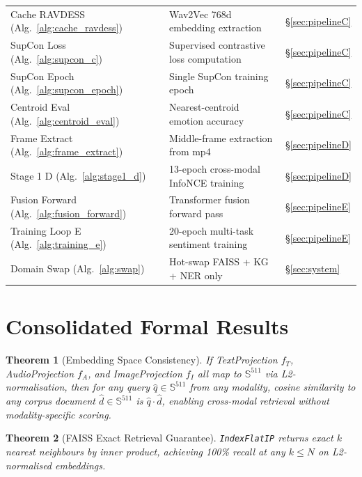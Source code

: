 \documentclass[12pt,a4paper]{article}
\theoremstyle{definition}
\theoremstyle{plain}
\newtheorem{theorem}{Theorem}[section]
\theoremstyle{remark}
\newcommand{\Sph}{\mathbb{S}}
\begin{document}
\begin{longtable}{p{3.5cm}p{7.5cm}p{3.5cm}}
Cache RAVDESS (Alg.~\ref{alg:cache_ravdess}) & Wav2Vec 768d embedding extraction & \S\ref{sec:pipelineC} \\[3pt]
SupCon Loss (Alg.~\ref{alg:supcon_c}) & Supervised contrastive loss computation & \S\ref{sec:pipelineC} \\[3pt]
SupCon Epoch (Alg.~\ref{alg:supcon_epoch}) & Single SupCon training epoch & \S\ref{sec:pipelineC} \\[3pt]
Centroid Eval (Alg.~\ref{alg:centroid_eval}) & Nearest-centroid emotion accuracy & \S\ref{sec:pipelineC} \\[3pt]
Frame Extract (Alg.~\ref{alg:frame_extract}) & Middle-frame extraction from mp4 & \S\ref{sec:pipelineD} \\[3pt]
Stage 1 D (Alg.~\ref{alg:stage1_d}) & 13-epoch cross-modal InfoNCE training & \S\ref{sec:pipelineD} \\[3pt]
Fusion Forward (Alg.~\ref{alg:fusion_forward}) & Transformer fusion forward pass & \S\ref{sec:pipelineE} \\[3pt]
Training Loop E (Alg.~\ref{alg:training_e}) & 20-epoch multi-task sentiment training & \S\ref{sec:pipelineE} \\[3pt]
Domain Swap (Alg.~\ref{alg:swap}) & Hot-swap FAISS + KG + NER only & \S\ref{sec:system} \\[3pt]
\end{longtable}

\section{Consolidated Formal Results}

\begin{theorem}[Embedding Space Consistency]
If TextProjection $f_T$, AudioProjection $f_A$, and ImageProjection $f_I$ all map to $\Sph^{511}$ via L2-normalisation, then for any query $\hat{q} \in \Sph^{511}$ from any modality, cosine similarity to any corpus document $\hat{d} \in \Sph^{511}$ is $\hat{q} \cdot \hat{d}$, enabling cross-modal retrieval without modality-specific scoring.
\end{theorem}

\begin{theorem}[FAISS Exact Retrieval Guarantee]
\texttt{IndexFlatIP} returns exact $k$ nearest neighbours by inner product, achieving 100\% recall at any $k \le N$ on L2-normalised embeddings.
\end{theorem}
\end{document}
